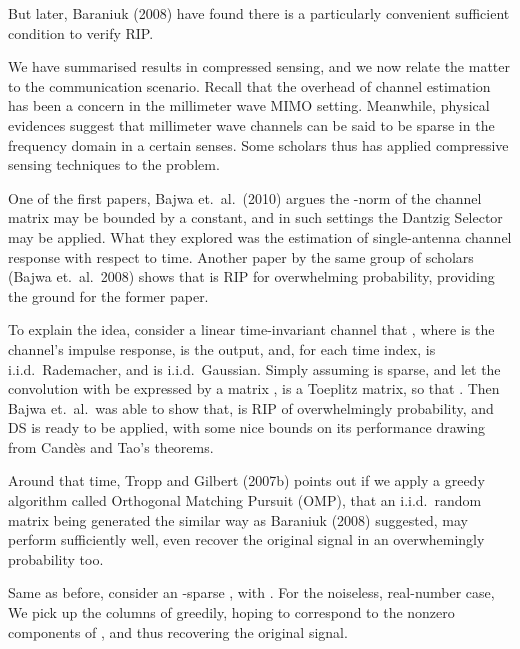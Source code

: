 But later, Baraniuk (2008) have found there is a particularly convenient sufficient condition to verify RIP.

We have summarised results in compressed sensing, and we now relate the matter to the communication scenario.
Recall that the overhead of channel estimation has been a concern in the millimeter wave MIMO setting.
Meanwhile, physical evidences suggest that millimeter wave channels can be said to be sparse in the frequency domain in a certain senses.
Some scholars thus has applied compressive sensing techniques to the problem.

One of the first papers, Bajwa et.\ al.\ (2010) argues the -norm of the channel matrix may be bounded by a constant, and in such settings the Dantzig Selector may be applied.
What they explored was the estimation of single-antenna channel response with respect to time.
Another paper by the same group of scholars (Bajwa et.\ al.\ 2008) shows that  is RIP for overwhelming probability, providing the ground for the former paper.

To explain the idea, consider a linear time-invariant channel that , where  is the channel's impulse response,  is the output, and, for each time index,  is i.i.d.\ Rademacher, and  is i.i.d.\ Gaussian.
Simply assuming  is sparse, and let the convolution with  be expressed by a matrix ,  is a Toeplitz matrix, so that .
Then Bajwa et.\ al.\ was able to show that,  is RIP of overwhelmingly probability, and DS is ready to be applied, with some nice bounds on its performance drawing from Cand\`es and Tao's theorems.

\stopsection
\startsection [title={Orthogonal Matching Pursuit}]

Around that time, Tropp and Gilbert (2007b) points out if we apply a greedy algorithm called Orthogonal Matching Pursuit (OMP), that an i.i.d.\ random matrix being generated the similar way as Baraniuk (2008) suggested, may perform sufficiently well, even recover the original signal in an overwhemingly probability too.

Same as before, consider an -sparse , with .
For the noiseless, real-number case,
We pick up the columns of \m {\M {\Phi}} greedily, hoping to correspond to the nonzero components of , and thus recovering the original signal.

